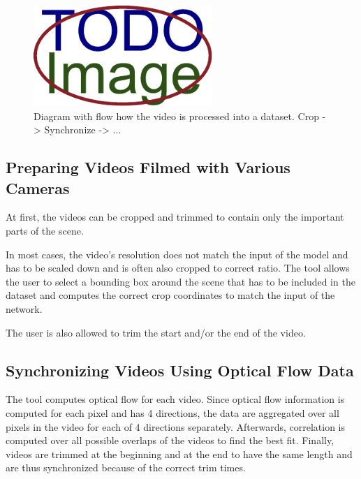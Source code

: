 \blindtext

\blindtext

\begin{figure}[ht]\centering
  \centering
  \includegraphics[width=\linewidth,height=1.5in]{figures/placeholder.pdf}
  \caption{Diagram with flow how the video is processed into a dataset. Crop -> Synchronize -> ...}
  \label{DatasetPreparation}
\end{figure}

\blindtext

\subsection{Preparing Videos Filmed with Various Cameras}

At first, the videos can be cropped and trimmed to contain only the important parts of the scene.
\blindtext

In most cases, the video's resolution does not match the input of the model and has to be scaled down and is often also cropped to correct ratio. The tool allows the user to select a bounding box around the scene that has to be included in the dataset and computes the correct crop coordinates to match the input of the network.

\blindtext

The user is also allowed to trim the start and/or the end of the video.
\blindtext

\subsection{Synchronizing Videos Using Optical Flow Data}

The tool computes optical flow for each video. Since optical flow information is computed for each pixel and has 4 directions, the data are aggregated over all pixels in the video for each of 4 directions separately. Afterwards, correlation is computed over all possible overlaps of the videos to find the best fit. Finally, videos are trimmed at the beginning and at the end to have the same length and are thus synchronized because of the correct trim times.


